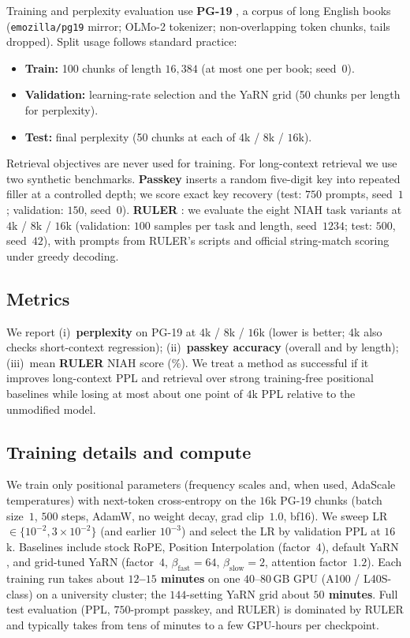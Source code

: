 \documentclass[11pt]{article}
\begin{document}
Training and perplexity evaluation use \textbf{PG-19} \citep{rae2020pg19},
a corpus of long English books (\texttt{emozilla/pg19} mirror; OLMo-2 tokenizer;
non-overlapping token chunks, tails dropped).
Split usage follows standard practice:
\begin{itemize}
    \item \textbf{Train:} 100 chunks of length $16{,}384$ (at most one per book; seed~$0$).
    \item \textbf{Validation:} learning-rate selection and the YaRN grid
    (50 chunks per length for perplexity).
    \item \textbf{Test:} final perplexity (50 chunks at each of $4$k / $8$k / $16$k).
\end{itemize}
Retrieval objectives are never used for training.
For long-context retrieval we use two synthetic benchmarks.
\textbf{Passkey} \citep{mohtashami2023landmark} inserts a random five-digit key into
repeated filler at a controlled depth; we score exact key recovery
(test: $750$ prompts, seed~$1$; validation: $150$, seed~$0$).
\textbf{RULER} \citep{hsieh2024ruler}: we evaluate the eight NIAH task variants
at $4$k / $8$k / $16$k (validation: $100$ samples per task and length, seed~$1234$;
test: $500$, seed~$42$), with prompts from RULER's scripts and official string-match
scoring under greedy decoding.

\subsection{Metrics}
\label{sec:metrics}

We report (i)~\textbf{perplexity} on PG-19 at $4$k / $8$k / $16$k
(lower is better; $4$k also checks short-context regression);
(ii)~\textbf{passkey accuracy} (overall and by length);
(iii)~mean \textbf{RULER} NIAH score (\%).
We treat a method as successful if it improves long-context PPL and retrieval over
strong training-free positional baselines while losing at most about one point of
$4$k PPL relative to the unmodified model.

\subsection{Training details and compute}
\label{sec:train-details}

We train only positional parameters (frequency scales and, when used, AdaScale
temperatures) with next-token cross-entropy on the $16$k PG-19 chunks
(batch size~$1$, $500$ steps, AdamW, no weight decay, grad clip~$1.0$, bf16).
We sweep LR $\in\{10^{-2},3{\times}10^{-2}\}$ (and earlier $10^{-3}$) and select
the LR by validation PPL at $16$k.
Baselines include stock RoPE, Position Interpolation \citep{chen2023pi} (factor~$4$),
default YaRN \citep{peng2024yarn}, and grid-tuned YaRN
(factor~$4$, $\beta_{\mathrm{fast}}{=}64$, $\beta_{\mathrm{slow}}{=}2$,
attention factor~$1.2$).
Each training run takes about \textbf{$12$--$15$ minutes} on one $40$--$80$\,GB GPU
(A100 / L40S-class) on a university cluster; the $144$-setting YaRN grid about \textbf{$50$ minutes}.
Full test evaluation (PPL, $750$-prompt passkey, and RULER) is dominated by RULER
and typically takes from tens of minutes to a few GPU-hours per checkpoint.
\end{document}
